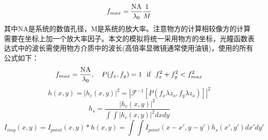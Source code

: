 \documentclass[draft=false,oneside]{fduthesis}
\begin{document}
    \begin{equation}
        f_{max}=\frac{\textup{NA}}{\lambda_0}\frac{1}{M}
    \end{equation}
    其中NA是系统的数值孔径，M是系统的放大率。注意物方的计算相较像方的计算需要在坐标上加一个放大率因子。本文的模拟将统一采用物方的坐标，光瞳函数表达式中的波长需使用物方介质中的波长(高倍率显微镜通常使用油镜)，使用的所有公式如下：
    \begin{equation}
        f_{max}=\frac{\textup{NA}}{\lambda_0},\ \ \ P(f_x,f_y)=1\ \ \textup{if} \ \ f_x^2+f_y^2<f_{max}^2
        \label{pupil_r}
    \end{equation}
    \begin{equation}
        h(x,y)=|h_c(x,y)|^2=|\mathscr{F}^{-1}[P(f_x\lambda z_o,f_y\lambda z_o)]|^2
    \end{equation}
    \begin{equation}
        h_s=\frac{|h_c(x,y)|^2}{\int\int |h_c(x,y)|^2dxdy}
    \end{equation}
    \begin{equation}
        I_{img}(x,y)=I_{point}(x,y)*h(x,y)=\int\int I_{point}(x-x',y-y')h_s(x',y')dx'dy'
    \end{equation}
\end{document}
